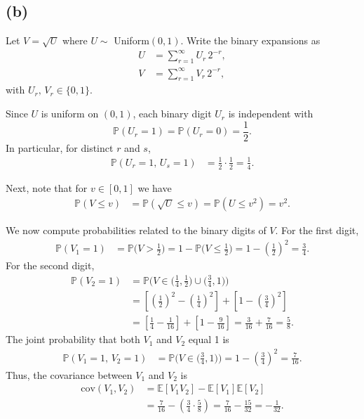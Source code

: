 \documentclass[letterpaper, 11pt]{article}
\newcommand{\1}{\mathds{1}}	%
\theoremstyle{definition}
\begin{document}
\subsection*{(b) }

Let \(V=\sqrt{U}\) where \(U\sim\) Uniform\((0,1)\). Write the binary expansions as
\begin{align*}
U &= \sum_{r=1}^{\infty} U_r\,2^{-r}, \\
V &= \sum_{r=1}^{\infty} V_r\,2^{-r},
\end{align*}
with \(U_r,\,V_r\in\{0,1\}\).

Since \(U\) is uniform on \((0,1)\), each binary digit \(U_r\) is independent with
\[
\mathbb{P}(U_r=1)=\mathbb{P}(U_r=0)=\frac{1}{2}.
\]
In particular, for distinct \(r\) and \(s\),
\begin{align*}
\mathbb{P}(U_r=1,\,U_s=1)
  &= \frac{1}{2}\cdot\frac{1}{2}=\frac{1}{4}.
\end{align*}

Next, note that for \(v\in[0,1]\) we have
\begin{align*}
\mathbb{P}(V\le v)
  &=\mathbb{P}(\sqrt{U}\le v)
  =\mathbb{P}(U\le v^2)
  = v^2.
\end{align*}

We now compute probabilities related to the binary digits of \(V\). For the first digit,
\begin{align*}
\mathbb{P}(V_1=1)
  &= \mathbb{P}\Big(V>\frac{1}{2}\Big)
   = 1-\mathbb{P}\Big(V\le\frac{1}{2}\Big)
   = 1-\left(\frac{1}{2}\right)^2
   = \frac{3}{4}.
\end{align*}
For the second digit,
\begin{align*}
\mathbb{P}(V_2=1)
  &= \mathbb{P}\Big(V\in\Big(\frac{1}{4},\frac{1}{2}\Big)\cup\Big(\frac{3}{4},1\Big)\Big) \\
  &= \left[\left(\frac{1}{2}\right)^2 - \left(\frac{1}{4}\right)^2\right]
     + \left[1 - \left(\frac{3}{4}\right)^2\right] \\
  &= \left[\frac{1}{4} - \frac{1}{16}\right]
     + \left[1 - \frac{9}{16}\right]
   = \frac{3}{16} + \frac{7}{16} = \frac{5}{8}.
\end{align*}
The joint probability that both \(V_1\) and \(V_2\) equal 1 is
\begin{align*}
\mathbb{P}(V_1=1,\,V_2=1)
  &= \mathbb{P}\Big(V\in\Big(\frac{3}{4},1\Big)\Big)
   = 1-\left(\frac{3}{4}\right)^2
   = \frac{7}{16}.
\end{align*}
Thus, the covariance between \(V_1\) and \(V_2\) is
\begin{align*}
\text{cov}(V_1,V_2)
  &= \mathbb{E}[V_1V_2]-\mathbb{E}[V_1]\mathbb{E}[V_2] \\
  &= \frac{7}{16} - \left(\frac{3}{4}\cdot\frac{5}{8}\right)
  = \frac{7}{16}-\frac{15}{32}
  = -\frac{1}{32}.
\end{align*}
\end{document}
